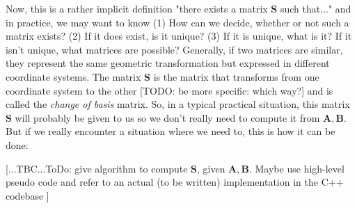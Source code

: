 



\medskip
Now, this is a rather implicit definition "there exists a matrix $\mathbf{S}$ such that..." and in practice, we may want to know (1) How can we decide, whether or not such a matrix exists? (2) If it does exist, is it unique? (3) If it is unique, what is it? If it isn't unique, what matrices are possible? Generally, if two matrices are similar, they represent the same geometric transformation but expressed in different coordinate systems. The matrix $\mathbf{S}$ is the matrix that transforms from one coordinate system to the other [TODO: be more specific: which way?] and is called the \emph{change of basis} matrix. So, in a typical practical situation, this matrix $\mathbf{S}$ will probably be given to us so we don't really need to compute it from $\mathbf{A,B}$. But if we really encounter a situation where we need to, this is how it can be done:

[...TBC...ToDo: give algorithm to compute $\mathbf{S}$, given $\mathbf{A,B}$. Maybe use high-level pseudo code and refer to an actual (to be written) implementation in the C++ codebase ]





